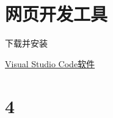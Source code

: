 \documentclass[
]{book}
\begin{document}
\hypertarget{ux7f51ux9875ux5f00ux53d1ux5de5ux5177}{%
\chapter{网页开发工具}\label{ux7f51ux9875ux5f00ux53d1ux5de5ux5177}}

下载并安装

\href{https://code.visualstudio.com/download}{Visual Studio Code软件}

\hypertarget{section}{%
\chapter{4}\label{section}}

\printbibliography
\end{document}

